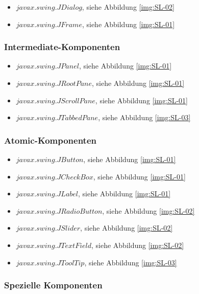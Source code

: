  \begin{itemize}
    \item \(javax.swing.JDialog\), siehe Abbildung \ref{img:SL-02}
    \item \(javax.swing.JFrame\), siehe Abbildung \ref{img:SL-01}
  \end{itemize}
  
  \subsubsection{Intermediate-Komponenten}
  
  \begin{itemize}
    \item \(javax.swing.JPanel\), siehe Abbildung \ref{img:SL-01}
    \item \(javax.swing.JRootPane\), siehe Abbildung \ref{img:SL-01}
    \item \(javax.swing.JScrollPane\), siehe Abbildung \ref{img:SL-01}
    \item \(javax.swing.JTabbedPane\), siehe Abbildung \ref{img:SL-03}
  \end{itemize}
  
  \subsubsection{Atomic-Komponenten}
  
  \begin{itemize}
    \item \(javax.swing.JButton\), siehe Abbildung \ref{img:SL-01}
    \item \(javax.swing.JCheckBox\), siehe Abbildung \ref{img:SL-01}
    \item \(javax.swing.JLabel\), siehe Abbildung \ref{img:SL-01}
    \item \(javax.swing.JRadioButton\), siehe Abbildung \ref{img:SL-02}
    \item \(javax.swing.JSlider\), siehe Abbildung \ref{img:SL-02}
    \item \(javax.swing.JTextField\), siehe Abbildung \ref{img:SL-02}
    \item \(javax.swing.JToolTip\), siehe Abbildung \ref{img:SL-03}
  \end{itemize}
  
  \subsubsection{Spezielle Komponenten}
  
